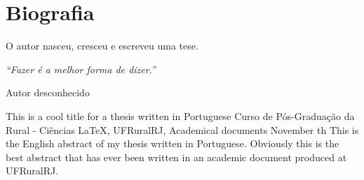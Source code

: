 \documentclass[tese]{UFRuralRJ}
\begin{document}

\chapter*{Biografia}
O autor nasceu, cresceu e escreveu uma tese.


\clearpage\mbox{}\vfill\hspace{80mm}\begin{minipage}{76mm}\begin{flushright}{\em
``Fazer é a melhor forma de dizer.''
\par
Autor desconhecido
}\end{flushright}\end{minipage}


\generalabstracttrue
\begin{abstract}
Este é o resumo em português de minha tese escrita em português. Claramente, 
este é o melhor resumo que já foi escrito em um documento acadêmico produzido na
UFRuralRJ.
\end{abstract}


\generalabstracttrue
\begin{englishabstract}
{This is a cool title for a thesis written in Portuguese} %
{Curso de Pós-Graduação da Rural - Ciências} %
{LaTeX, UFRuralRJ, Academical documents} %
{November} %
{th} %
This is the English abstract of my thesis written in Portuguese. Obviously this
is the best abstract that has ever been written in an academic document produced
at UFRuralRJ.
\end{englishabstract}

\end{document}
